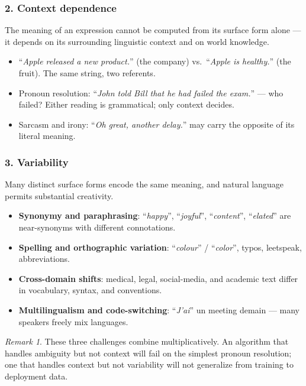 \documentclass[12pt,a4paper]{report}
\theoremstyle{definition}
\theoremstyle{remark}
\newtheorem{remark}{Remark}[section]
\begin{document}
\subsubsection*{2. Context dependence}

The meaning of an expression cannot be computed from its surface form alone --- it depends on its surrounding linguistic context and on world knowledge.

\begin{itemize}
    \item ``\emph{Apple released a new product.}'' (the company) vs.\ ``\emph{Apple is healthy.}'' (the fruit). The same string, two referents.
    \item Pronoun resolution: ``\emph{John told Bill that he had failed the exam.}'' --- who failed? Either reading is grammatical; only context decides.
    \item Sarcasm and irony: ``\emph{Oh great, another delay.}'' may carry the opposite of its literal meaning.
\end{itemize}

\subsubsection*{3. Variability}

Many distinct surface forms encode the same meaning, and natural language permits substantial creativity.

\begin{itemize}
    \item \textbf{Synonymy and paraphrasing}: ``\emph{happy}'', ``\emph{joyful}'', ``\emph{content}'', ``\emph{elated}'' are near-synonyms with different connotations.
    \item \textbf{Spelling and orthographic variation}: ``\emph{colour}'' / ``\emph{color}'', typos, leetspeak, abbreviations.
    \item \textbf{Cross-domain shifts}: medical, legal, social-media, and academic text differ in vocabulary, syntax, and conventions.
    \item \textbf{Multilingualism and code-switching}: ``\emph{J'ai}'' un meeting demain --- many speakers freely mix languages.
\end{itemize}

\begin{remark}
These three challenges combine multiplicatively. An algorithm that handles ambiguity but not context will fail on the simplest pronoun resolution; one that handles context but not variability will not generalize from training to deployment data.
\end{remark}
\end{document}

